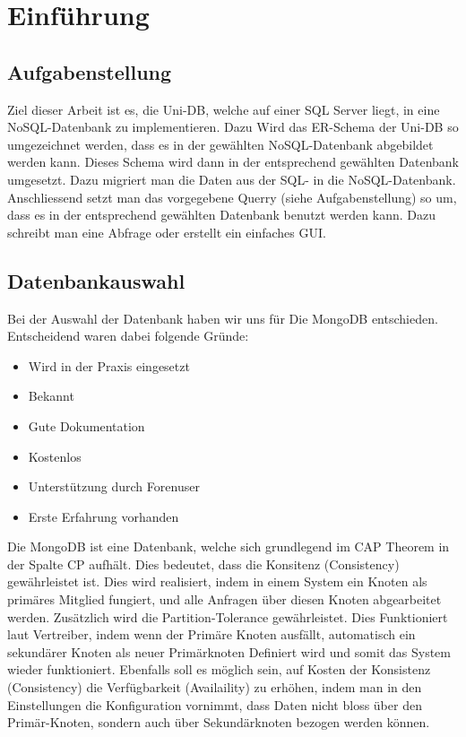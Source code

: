 \section{Einführung}

\subsection{Aufgabenstellung}
Ziel dieser Arbeit ist es, die Uni-DB, welche auf einer SQL Server liegt, in eine NoSQL-Datenbank zu implementieren. Dazu Wird das ER-Schema der Uni-DB so umgezeichnet werden, dass es in der gewählten NoSQL-Datenbank abgebildet werden kann. Dieses Schema wird dann in der entsprechend gewählten Datenbank umgesetzt. Dazu migriert man die Daten aus der SQL- in die NoSQL-Datenbank.
Anschliessend setzt man das vorgegebene Querry (siehe Aufgabenstellung) so um, dass es in der entsprechend gewählten Datenbank benutzt werden kann. Dazu schreibt man eine Abfrage oder erstellt ein einfaches GUI.

\newpage
\subsection{Datenbankauswahl}
Bei der Auswahl der Datenbank haben wir uns für Die MongoDB entschieden. Entscheidend waren dabei folgende Gründe:
\begin{itemize}
  \item Wird in der Praxis eingesetzt
  \item Bekannt
  \item Gute Dokumentation
  \item Kostenlos
  \item Unterstützung durch Forenuser
  \item Erste Erfahrung vorhanden
\end{itemize}

Die MongoDB ist eine Datenbank, welche sich grundlegend im CAP Theorem in der Spalte CP aufhält. Dies bedeutet, dass die Konsitenz (Consistency) gewährleistet ist. Dies wird realisiert, indem in einem System ein Knoten als primäres Mitglied fungiert, und alle Anfragen über diesen Knoten abgearbeitet werden. Zusätzlich wird die Partition-Tolerance gewährleistet. Dies Funktioniert laut Vertreiber, indem wenn der Primäre Knoten ausfällt, automatisch ein sekundärer Knoten als neuer Primärknoten Definiert wird und somit das System wieder funktioniert.
Ebenfalls soll es möglich sein, auf Kosten der Konsistenz (Consistency) die Verfügbarkeit (Availaility) zu erhöhen, indem man in den Einstellungen die Konfiguration vornimmt, dass Daten nicht bloss über den Primär-Knoten, sondern auch über Sekundärknoten bezogen werden können.


